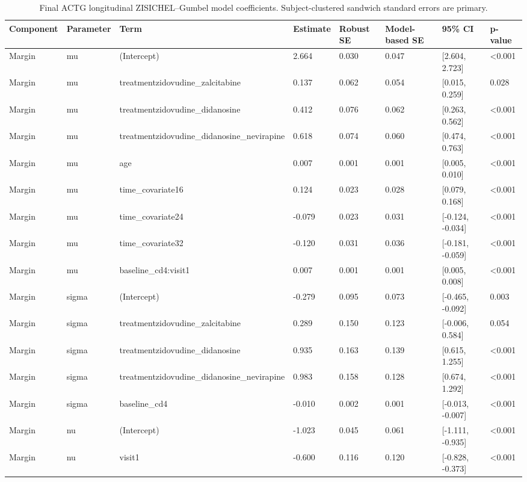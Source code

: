 \begin{table}

\caption{Final ACTG longitudinal ZISICHEL--Gumbel model coefficients. Subject-clustered sandwich standard errors are primary.}
\centering
\begin{tabular}[t]{llllllll}
\toprule
Component & Parameter & Term & Estimate & Robust SE & Model-based SE & 95\% CI & p-value\\
\midrule
Margin & mu & (Intercept) & 2.664 & 0.030 & 0.047 & {}[2.604, 2.723] & <0.001\\
Margin & mu & treatmentzidovudine\_zalcitabine & 0.137 & 0.062 & 0.054 & {}[0.015, 0.259] & 0.028\\
Margin & mu & treatmentzidovudine\_didanosine & 0.412 & 0.076 & 0.062 & {}[0.263, 0.562] & <0.001\\
Margin & mu & treatmentzidovudine\_didanosine\_nevirapine & 0.618 & 0.074 & 0.060 & {}[0.474, 0.763] & <0.001\\
Margin & mu & age & 0.007 & 0.001 & 0.001 & {}[0.005, 0.010] & <0.001\\
\addlinespace
Margin & mu & time\_covariate16 & 0.124 & 0.023 & 0.028 & {}[0.079, 0.168] & <0.001\\
Margin & mu & time\_covariate24 & -0.079 & 0.023 & 0.031 & {}[-0.124, -0.034] & <0.001\\
Margin & mu & time\_covariate32 & -0.120 & 0.031 & 0.036 & {}[-0.181, -0.059] & <0.001\\
Margin & mu & baseline\_cd4:visit1 & 0.007 & 0.001 & 0.001 & {}[0.005, 0.008] & <0.001\\
Margin & sigma & (Intercept) & -0.279 & 0.095 & 0.073 & {}[-0.465, -0.092] & 0.003\\
\addlinespace
Margin & sigma & treatmentzidovudine\_zalcitabine & 0.289 & 0.150 & 0.123 & {}[-0.006, 0.584] & 0.054\\
Margin & sigma & treatmentzidovudine\_didanosine & 0.935 & 0.163 & 0.139 & {}[0.615, 1.255] & <0.001\\
Margin & sigma & treatmentzidovudine\_didanosine\_nevirapine & 0.983 & 0.158 & 0.128 & {}[0.674, 1.292] & <0.001\\
Margin & sigma & baseline\_cd4 & -0.010 & 0.002 & 0.001 & {}[-0.013, -0.007] & <0.001\\
Margin & nu & (Intercept) & -1.023 & 0.045 & 0.061 & {}[-1.111, -0.935] & <0.001\\
\addlinespace
Margin & nu & visit1 & -0.600 & 0.116 & 0.120 & {}[-0.828, -0.373] & <0.001\\

\end{tabular}
\end{table}

